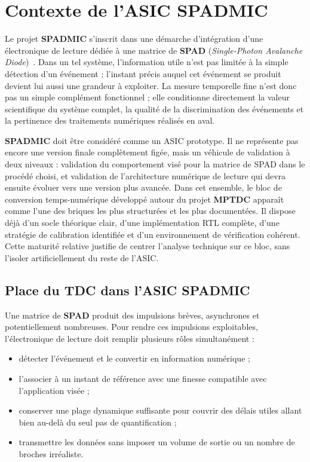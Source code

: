 \chapter{Contexte de l'ASIC SPADMIC}
\label{chap:spadmic}
\justifying
\sloppy

Le projet \textbf{SPADMIC} s'inscrit dans une démarche d'intégration d'une électronique de lecture dédiée à une matrice de \textbf{SPAD} (\textit{Single-Photon Avalanche Diode})~\cite{cova1996spad,becker2005tcspc}. Dans un tel système, l'information utile n'est pas limitée à la simple détection d'un événement : l'instant précis auquel cet événement se produit devient lui aussi une grandeur à exploiter. La mesure temporelle fine n'est donc pas un simple complément fonctionnel ; elle conditionne directement la valeur scientifique du système complet, la qualité de la discrimination des événements et la pertinence des traitements numériques réalisés en aval.

\textbf{SPADMIC} doit être considéré comme un ASIC prototype. Il ne représente pas encore une version finale complètement figée, mais un véhicule de validation à deux niveaux : validation du comportement visé pour la matrice de SPAD dans le procédé choisi, et validation de l'architecture numérique de lecture qui devra ensuite évoluer vers une version plus avancée. Dans cet ensemble, le bloc de conversion temps-numérique développé autour du projet \textbf{MPTDC} apparaît comme l'une des briques les plus structurées et les plus documentées. Il dispose déjà d'un socle théorique clair, d'une implémentation RTL complète, d'une stratégie de calibration identifiée et d'un environnement de vérification cohérent. Cette maturité relative justifie de centrer l'analyse technique sur ce bloc, sans l'isoler artificiellement du reste de l'ASIC.

\section{Place du TDC dans l'ASIC SPADMIC}

Une matrice de \textbf{SPAD} produit des impulsions brèves, asynchrones et potentiellement nombreuses. Pour rendre ces impulsions exploitables, l'électronique de lecture doit remplir plusieurs rôles simultanément :
\begin{itemize}
    \item détecter l'événement et le convertir en information numérique ;
    \item l'associer à un instant de référence avec une finesse compatible avec l'application visée ;
    \item conserver une plage dynamique suffisante pour couvrir des délais utiles allant bien au-delà du seul pas de quantification ;
    \item transmettre les données sans imposer un volume de sortie ou un nombre de broches irréaliste.
\end{itemize}

